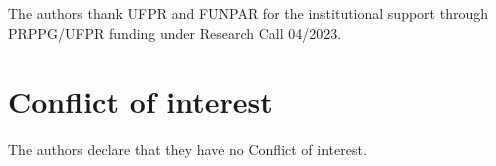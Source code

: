 \documentclass[sn-mathphys]{sn-jnl}%
\theoremstyle{thmstyleone}%
\theoremstyle{thmstyletwo}%
\theoremstyle{thmstylethree}%
\begin{document}
The authors thank UFPR and FUNPAR for the institutional support through PRPPG/UFPR funding under Research Call 04/2023.

\section{Conflict of interest}

The authors declare that they have no Conflict of interest.

%

%
\end{document}
